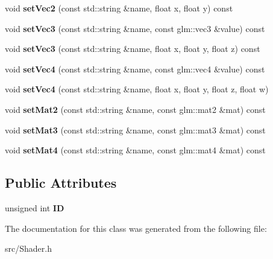 \begin{DoxyCompactItemize}
void {\bfseries set\+Vec2} (const std\+::string \&name, float x, float y) const
\item 
\mbox{\label{classdarksun_1_1_shader_a267d47c101f7cee2fa531b2cb58fee6b}} 
void {\bfseries set\+Vec3} (const std\+::string \&name, const glm\+::vec3 \&value) const
\item 
\mbox{\label{classdarksun_1_1_shader_a77d72679daead3f9ddfbed0a4194c7b0}} 
void {\bfseries set\+Vec3} (const std\+::string \&name, float x, float y, float z) const
\item 
\mbox{\label{classdarksun_1_1_shader_a3e3b766c616a321066d19d872344ba84}} 
void {\bfseries set\+Vec4} (const std\+::string \&name, const glm\+::vec4 \&value) const
\item 
\mbox{\label{classdarksun_1_1_shader_ad09bd6840506826a5f8c4bbc46c58d91}} 
void {\bfseries set\+Vec4} (const std\+::string \&name, float x, float y, float z, float w)
\item 
\mbox{\label{classdarksun_1_1_shader_a107c1cbd4c9c9838325f2ba5b3ce2c2d}} 
void {\bfseries set\+Mat2} (const std\+::string \&name, const glm\+::mat2 \&mat) const
\item 
\mbox{\label{classdarksun_1_1_shader_af0a4b407e839f89bdfe301c5eb558d7e}} 
void {\bfseries set\+Mat3} (const std\+::string \&name, const glm\+::mat3 \&mat) const
\item 
\mbox{\label{classdarksun_1_1_shader_a4132b5d99022ea0c286304066127558d}} 
void {\bfseries set\+Mat4} (const std\+::string \&name, const glm\+::mat4 \&mat) const
\end{DoxyCompactItemize}
\subsection*{Public Attributes}
\begin{DoxyCompactItemize}
\item 
\mbox{\label{classdarksun_1_1_shader_a981715464c045efc5782daa90aed69c7}} 
unsigned int {\bfseries ID}
\end{DoxyCompactItemize}


The documentation for this class was generated from the following file\+:\begin{DoxyCompactItemize}
\item 
src/Shader.\+h\end{DoxyCompactItemize}
